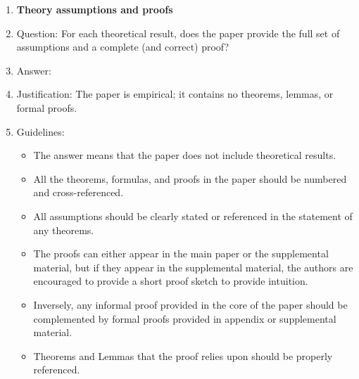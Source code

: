 \begin{enumerate}
\begin{itemize}
        \item The authors should discuss the computational efficiency of the proposed algorithms and how they scale with dataset size.
        \item If applicable, the authors should discuss possible limitations of their approach to address problems of privacy and fairness.
        \item While the authors might fear that complete honesty about limitations might be used by reviewers as grounds for rejection, a worse outcome might be that reviewers discover limitations that aren't acknowledged in the paper. The authors should use their best judgment and recognize that individual actions in favor of transparency play an important role in developing norms that preserve the integrity of the community. Reviewers will be specifically instructed to not penalize honesty concerning limitations.
    \end{itemize}

\item {\bf Theory assumptions and proofs}
    \item[] Question: For each theoretical result, does the paper provide the full set of assumptions and a complete (and correct) proof?
    \item[] Answer: \answerNA{}
    \item[] Justification: The paper is empirical; it contains no theorems, lemmas, or formal proofs.
    \item[] Guidelines:
    \begin{itemize}
        \item The answer \answerNA{} means that the paper does not include theoretical results. 
        \item All the theorems, formulas, and proofs in the paper should be numbered and cross-referenced.
        \item All assumptions should be clearly stated or referenced in the statement of any theorems.
        \item The proofs can either appear in the main paper or the supplemental material, but if they appear in the supplemental material, the authors are encouraged to provide a short proof sketch to provide intuition. 
        \item Inversely, any informal proof provided in the core of the paper should be complemented by formal proofs provided in appendix or supplemental material.
        \item Theorems and Lemmas that the proof relies upon should be properly referenced. 
    \end{itemize}


\end{enumerate}
